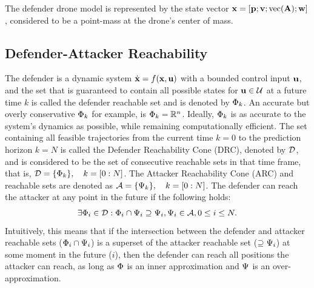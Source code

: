 \documentclass[letterpaper,10pt,conference]{ieeeconf}
\begin{document}
The defender drone model is represented by the state vector $\mathbf{x} = [\mathbf{p}; \mathbf{v}; \text{vec}(\mathbf{A}); \mathbf{w}]$, considered to be a point-mass at the drone's center of mass.


\subsection{Defender-Attacker Reachability}
\label{ssec:area-defense}


The defender is a dynamic system $\dot{\mathbf{x}} = f(\mathbf{x},\mathbf{u})$ with a bounded control input $\mathbf{u}$, and the set that is guaranteed to contain all possible states for $\mathbf{u} \in \mathcal{U}$ at a future time $k$ is called the defender reachable set and is denoted by $\Phi_k$. An accurate but overly conservative $\Phi_k$ for example, is $\Phi_k = \mathbb{R}^n$. Ideally, $\Phi_k$ is as accurate to the system's dynamics as possible, while remaining computationally efficient. The set containing all feasible trajectories from the current time $k=0$ to the prediction horizon $k=N$ is called the Defender Reachability Cone (DRC), denoted by $\mathcal{D}$, and is considered to be the set of consecutive reachable sets in that time frame, that is, $\mathcal{D} = \{\Phi_k\}, \quad k=[0:N]$. The Attacker Reachability Cone (ARC) and reachable sets are denoted as $\mathcal{A} = \{\Psi_k\}, \quad k=[0:N]$. The defender can reach the attacker at any point in the future if the following holds:
\begin{equation}
    \exists \Phi_i \in  \mathcal{D} : \Phi_i \cap \Psi_i \supseteq \Psi_i, \Psi_i \in \mathcal{A}, 0 \le i\le N.
    \label{eq:reach-condition}
\end{equation}
Intuitively, this means that if the intersection between the defender and attacker reachable sets ($\Phi_i \cap \Psi_i$) is a superset of the attacker reachable set ($\supseteq \Psi_i$) at some moment in the future ($i$), then the defender can reach all positions the attacker can reach, as long as $\Phi$ is an inner approximation and $\Psi$ is an over-approximation. 
\end{document}

